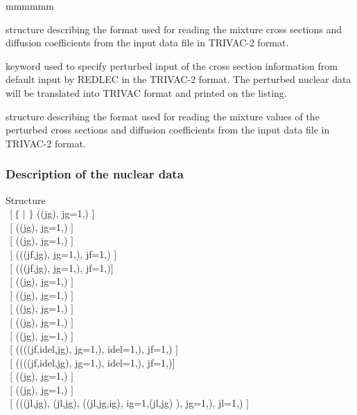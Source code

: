 \begin{ListeDeDescription}{mmmmmm}
\item[\dstr{triv2}] structure describing the format used  for reading the
mixture cross sections and diffusion coefficients from the input data file in
TRIVAC-2 format.
 
\item[\moc{DOLD}] keyword used to specify  perturbed input of the cross
section information from default input by REDLEC in the TRIVAC-2 format. The
perturbed nuclear data will be translated into TRIVAC format and printed on
the listing.

\item[\dstr{trip2}] structure describing the  format used for reading the
mixture values of the perturbed cross sections and diffusion coefficients from
the input data file in TRIVAC-2 format.

\end{ListeDeDescription}

\vskip 0.2cm
\goodbreak

\subsubsection{Description of the nuclear data}

\begin{DataStructure}{Structure }
  \\
$~~[~\{$  $|$  $\}$ ((jg),    jg=1,) $]$ \\
$~~[$  ((jg),    jg=1,) $]$ \\
$~~[$  ((jg),    jg=1,) $]$ \\
$~~[$  (((jf,jg), jg=1,), jf=1,) $]$ \\
$~~[$     (((jf,jg),    jg=1,), jf=1,)$]$ \\
$~~[$    ((jg),    jg=1,) $]$ \\
$~~[$    ((jg),    jg=1,) $]$ \\
$~~[$  ((jg), jg=1,) $]$ \\
$~~[$  ((jg), jg=1,) $]$ \\
$~~[$  ((jg), jg=1,) $]$ \\
$~~[$  ((((jf,idel,jg), jg=1,), idel=1,), jf=1,) $]$ \\
$~~[$    ((((jf,idel,jg), jg=1,), idel=1,), jf=1,)$]$ \\
$~~[$  ((jg), jg=1,) $]$ \\
$~~[$  ((jg), jg=1,) $]$ \\
$~~[$  (((jl,jg), (jl,jg), ((jl,jg,ig), ig=1,(jl,jg) ), jg=1,), jl=1,) $]$
\end{DataStructure}

